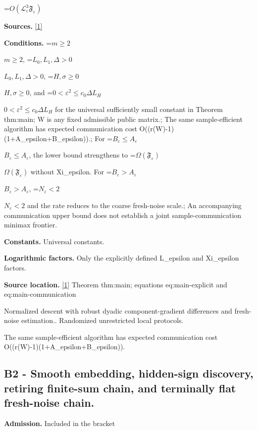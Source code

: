 \documentclass[10pt,a4paper]{article}
\newcommand{\AtlasMath}[1]{\par\begingroup\centering\setbox0=\hbox{$\displaystyle #1$}\ifdim\wd0>1.4\linewidth\typeout{ATLAS WIDE FORMULA: \the\wd0}\fi\ifdim\wd0>\linewidth\resizebox{\linewidth}{!}{\box0}\else\box0\fi\par\endgroup}
\newcommand{\AtlasInlineMath}[1]{\begingroup\setbox0=\hbox{$#1$}\ifdim\wd0>.4\linewidth\endgroup\AtlasMath{#1}\else\endgroup$#1$\fi}
\begin{document}
\AtlasMath{O(\mathcal L_\varepsilon^3\mathfrak F_\varepsilon)}


\textbf{Sources.} \href{https://github.com/WU-Wendao/Colombo/blob/main/colombo_sensorium/Complexity_altas/data/sources/colombo/N15/manuscript.pdf}{[1]}



\textbf{Conditions.} \AtlasInlineMath{m\ge2}, \AtlasInlineMath{L_0,L_1,\Delta>0}, \AtlasInlineMath{H,\sigma\ge0}, and \AtlasInlineMath{0<\varepsilon^2\le c_0\Delta L_H} for the universal sufficiently small constant in Theorem thm:main; W is any fixed admissible public matrix.; The same sample-efficient algorithm has expected communication cost O((r(W)-1)(1+A\_epsilon+B\_epsilon)).; For \AtlasInlineMath{B_\varepsilon\le A_\varepsilon}, the lower bound strengthens to \AtlasInlineMath{\Omega(\mathfrak F_\varepsilon)} without Xi\_epsilon. For \AtlasInlineMath{B_\varepsilon>A_\varepsilon}, \AtlasInlineMath{N_\varepsilon<2} and the rate reduces to the coarse fresh-noise scale.; An accompanying communication upper bound does not establish a joint sample-communication minimax frontier.



\textbf{Constants.} Universal constants.



\textbf{Logarithmic factors.} Only the explicitly defined L\_epsilon and Xi\_epsilon factors.



\textbf{Source location.} \href{https://github.com/WU-Wendao/Colombo/blob/main/colombo_sensorium/Complexity_altas/data/sources/colombo/N15/manuscript.pdf}{[1]} Theorem thm:main; equations eq:main-explicit and eq:main-communication



Normalized descent with robust dyadic component-gradient differences and fresh-noise estimation.. Randomized unrestricted local protocols.



The same sample-efficient algorithm has expected communication cost O((r(W)-1)(1+A\_epsilon+B\_epsilon)).



\subsection{B2 - Smooth embedding, hidden-sign discovery, retiring finite-sum chain, and terminally flat fresh-noise chain.}


\textbf{Admission.} Included in the bracket
\end{document}
